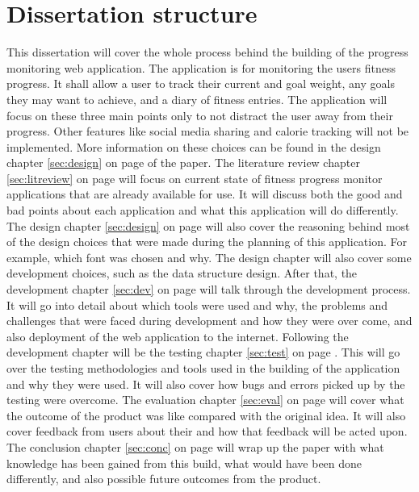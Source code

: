 \section{Dissertation structure}
This dissertation will cover the whole process behind the building of the progress monitoring web application. The application is for monitoring the users fitness progress. It shall allow a user to track their current and goal weight, any goals they may want to achieve, and a diary of fitness entries. The application will focus on these three main points only to not distract the user away from their progress. Other features like social media sharing and calorie tracking will not be implemented. More information on these choices can be found in the design chapter \ref{sec:design} on page \pageref{sec:design} of the paper. The literature review chapter \ref{sec:litreview} on page \pageref{sec:litreview} will focus on current state of fitness progress monitor applications that are already available for use. It will discuss both the good and bad points about each application and what this application will do differently. The design chapter \ref{sec:design} on page \pageref{sec:design} will also cover the reasoning behind most of the design choices that were made during the planning of this application. For example, which font was chosen and why. The design chapter will also cover some development choices, such as the data structure design. After that, the development chapter \ref{sec:dev} on page \pageref{sec:dev} will talk through the development process. It will go into detail about which tools were used and why, the problems and challenges that were faced during development and how they were over come, and also deployment of the web application to the internet. Following the development chapter will be the testing chapter \ref{sec:test} on page \pageref{sec:test}. This will go over the testing methodologies and tools used in the building of the application and why they were used. It will also cover how bugs and errors picked up by the testing were overcome. The evaluation chapter \ref{sec:eval} on page \pageref{sec:eval} will cover what the outcome of the product was like compared with the original idea. It will also cover feedback from users about their and how that feedback will be acted upon. The conclusion chapter \ref{sec:conc} on page \pageref{sec:conc} will wrap up the paper with what knowledge has been gained from this build, what would have been done differently, and also possible future outcomes from the product.\\

